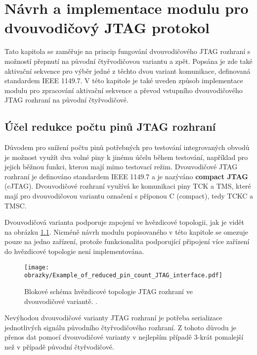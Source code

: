 
\chapter{Návrh a implementace modulu pro dvouvodičový \acs{JTAG} protokol}
Tato kapitola se zaměřuje na princip fungování dvouvodičového \acs{JTAG} rozhraní s možností přepnutí na původní čtyřvodičovou variantu a zpět. Popsána je zde také aktivační sekvence pro výběr jedné z těchto dvou variant komunikace, definovaná standardem IEEE 1149.7. V této kapitole je také uveden způsob implementace modulu pro zpracování aktivační sekvence a převod vstupního dvouvodičového \acs{JTAG} rozhraní na původní čtyřvodičové. %
	
\section{Účel redukce počtu pinů \acs{JTAG} rozhraní}	\label{sec:2w_interface}
Důvodem pro snížení počtu pinů potřebných pro testování integrovaných obvodů je možnost využít dva volné piny k jinému účelu během testování, například pro jejich běžnou funkci, kterou mají mimo testovací režim. Dvouvodičové \acs{JTAG} rozhraní je definováno standardem IEEE 1149.7 a je nazýváno \textbf{compact \acs{JTAG}} (c\acs{JTAG}). Dvouvodičové rozhraní využívá ke komunikaci piny \acs{TCK} a \acs{TMS}, které mají pro dvouvodičovou variantu označení s příponou C (compact), tedy \acs{TCKC} a \acs{TMSC}. \cite{IEEE_1149-7} \cite{JTAG}

Dvouvodičová varianta podporuje zapojení ve hvězdicové topologii, jak je vidět na obrázku \ref{fig:star2_sch}. Nicméně návrh modulu popisovaného v této kapitole se omezuje pouze na jedno zařízení, protože funkcionalita podporující připojení více zařízení do hvězdicové topologie není implementována.

\begin{figure}[!h]
  \begin{center}
    \texttt{[image: obrazky/Example\_of\_reduced\_pin\_count\_JTAG\_interface.pdf]}
  \end{center}
  \caption{Blokové schéma hvězdicové topologie \acs{JTAG} rozhraní ve dvouvodičové variantě. \cite{JTAG}.}
	\label{fig:star2_sch}
\end{figure}

Nevýhodou dvouvodičové varianty \acs{JTAG} rozhraní je potřeba serializace jednotlivých signálu původního čtyřvodičového rozhraní. Z tohoto důvodu je přenos dat pomocí dvouvodičové varianty v nejlepším případě 3-krát pomalejší než v případě původní čtyřvodičové. \cite{IEEE_1149-7}

